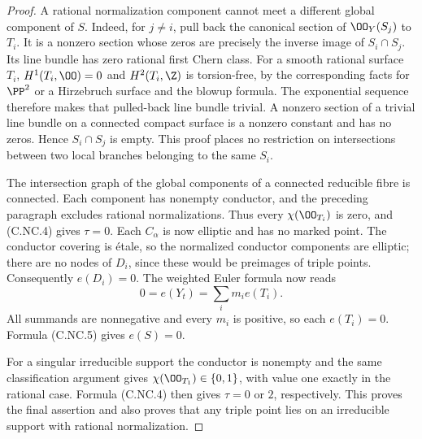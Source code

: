 \begin{proof}
A rational normalization component cannot meet a different global component of $S$. Indeed, for $j\ne i$, pull back the canonical section of $\OO_Y(S_j)$ to $T_i$. It is a nonzero section whose zeros are precisely the inverse image of $S_i\cap S_j$. Its line bundle has zero rational first Chern class. For a smooth rational surface $T_i$, $H^1(T_i,\OO)=0$ and $H^2(T_i,\Z)$ is torsion-free, by the corresponding facts for $\PP^2$ or a Hirzebruch surface and the blowup formula. The exponential sequence therefore makes that pulled-back line bundle trivial. A nonzero section of a trivial line bundle on a connected compact surface is a nonzero constant and has no zeros. Hence $S_i\cap S_j$ is empty. This proof places no restriction on intersections between two local branches belonging to the same $S_i$.

The intersection graph of the global components of a connected reducible fibre is connected. Each component has nonempty conductor, and the preceding paragraph excludes rational normalizations. Thus every $\chi(\OO_{T_i})$ is zero, and (C.NC.4) gives $\tau=0$. Each $C_\alpha$ is now elliptic and has no marked point. The conductor covering is étale, so the normalized conductor components are elliptic; there are no nodes of $D_i$, since these would be preimages of triple points. Consequently $e(D_i)=0$. The weighted Euler formula now reads
\[
 0=e(Y_t)=\sum_i m_i e(T_i).
\]
All summands are nonnegative and every $m_i$ is positive, so each $e(T_i)=0$. Formula (C.NC.5) gives $e(S)=0$.

For a singular irreducible support the conductor is nonempty and the same classification argument gives $\chi(\OO_{T_1})\in\{0,1\}$, with value one exactly in the rational case. Formula (C.NC.4) then gives $\tau=0$ or $2$, respectively. This proves the final assertion and also proves that any triple point lies on an irreducible support with rational normalization.
\end{proof}

